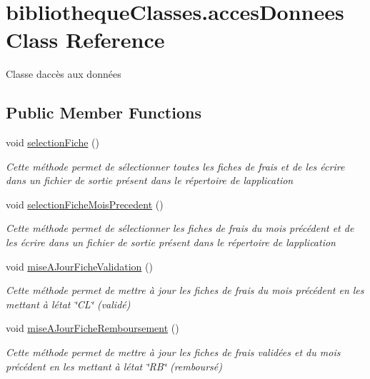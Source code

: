 \hypertarget{classbibliotheque_classes_1_1acces_donnees}{}\section{bibliotheque\+Classes.\+acces\+Donnees Class Reference}
\label{classbibliotheque_classes_1_1acces_donnees}


Classe d\textquotesingle{}accès aux données  


\subsection*{Public Member Functions}
\begin{DoxyCompactItemize}
\item 
void \mbox{\hyperlink{classbibliotheque_classes_1_1acces_donnees_a3d5707c0c32ffef3ffb96024c429962c}{selection\+Fiche}} ()
\begin{DoxyCompactList}\small\item\em Cette méthode permet de sélectionner toutes les fiches de frais et de les écrire dans un fichier de sortie présent dans le répertoire de l\textquotesingle{}application \end{DoxyCompactList}\item 
void \mbox{\hyperlink{classbibliotheque_classes_1_1acces_donnees_a28c549fe1997665d275fd37d97414990}{selection\+Fiche\+Mois\+Precedent}} ()
\begin{DoxyCompactList}\small\item\em Cette méthode permet de sélectionner les fiches de frais du mois précédent et de les écrire dans un fichier de sortie présent dans le répertoire de l\textquotesingle{}application \end{DoxyCompactList}\item 
void \mbox{\hyperlink{classbibliotheque_classes_1_1acces_donnees_a05d611d9c6a77bdcf589092a68e6d262}{mise\+A\+Jour\+Fiche\+Validation}} ()
\begin{DoxyCompactList}\small\item\em Cette méthode permet de mettre à jour les fiches de frais du mois précédent en les mettant à l\textquotesingle{}état \char`\"{}\+C\+L\char`\"{} (validé) \end{DoxyCompactList}\item 
void \mbox{\hyperlink{classbibliotheque_classes_1_1acces_donnees_a3f6ab640fe018b0143515d0d8cbeda80}{mise\+A\+Jour\+Fiche\+Remboursement}} ()
\begin{DoxyCompactList}\small\item\em Cette méthode permet de mettre à jour les fiches de frais validées et du mois précédent en les mettant à l\textquotesingle{}état \char`\"{}\+R\+B\char`\"{} (remboursé) \end{DoxyCompactList}\end{DoxyCompactItemize}

